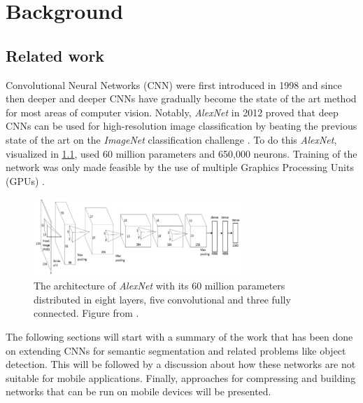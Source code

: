\documentclass{kththesis}
\newcommand{\bibentry}[1]{\parencite{#1}}
\begin{document}
\chapter{Background}
\section{Related work}
Convolutional Neural Networks (CNN) were first introduced in 1998
\bibentry{lecun1998gradient} and since then deeper and deeper CNNs have gradually
become the state of the art method for most areas of computer vision. Notably,
\emph{AlexNet} \bibentry{krizhevsky2012imagenet} in 2012 proved that deep
CNNs can be used for high-resolution image classification by beating the
previous state of the art \bibentry{sanchez2011high} on the \emph{ImageNet}
classification challenge \bibentry{deng2009imagenet}. To do this \emph{AlexNet},
visualized in \cref{fig:AlexNet}, 
used 60 million parameters and 650,000 neurons. Training of the network was
only made feasible by the use of multiple Graphics Processing Units (GPUs)
\bibentry{krizhevsky2012imagenet}.

\begin{figure}[h]
  \centering
  \includegraphics[width=0.7\textwidth]{AlexNet}
  \caption{The architecture of \textit{AlexNet} with its 60 million parameters
    distributed
    in eight layers, five convolutional and three fully connected. Figure from \textcite{krizhevsky2012imagenet}.}
  \label{fig:AlexNet}
  \end{figure}

The following sections will start with a summary of the work that has been done
on extending CNNs for semantic segmentation and related problems like
object detection. This will be followed by a discussion about how these networks
are not suitable for mobile applications. Finally, approaches for compressing
and building networks that can be run on mobile devices will be presented.
\end{document}
